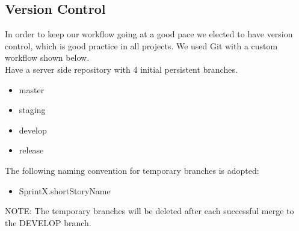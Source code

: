 \subsection{Version Control}
\label{sec:git}

In order to keep our workflow going at a good pace we elected to have version control, which is good practice in all projects. We used Git with a custom workflow shown below. \\

Have a server side repository with 4 initial persistent branches.
\begin{itemize}
\item master
\item staging
\item develop
\item release
\end{itemize}

The following naming convention for temporary branches is adopted: 

\begin{itemize}
\item SprintX.shortStoryName
\end{itemize}

NOTE: The temporary branches will be deleted after each successful merge to the DEVELOP branch.

